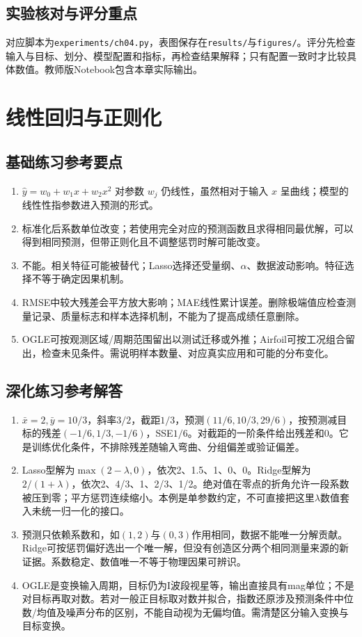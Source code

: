 \section*{实验核对与评分重点}
对应脚本为\texttt{experiments/ch04.py}，表图保存在\texttt{results/}与\texttt{figures/}。评分先检查输入与目标、划分、模型配置和指标，再检查结果解释；只有配置一致时才比较具体数值。教师版Notebook包含本章实际输出。

\chapter{线性回归与正则化}
\section*{基础练习参考要点}
\begin{enumerate}[label=\arabic*.]
\item $\hat y=w_0+w_1x+w_2x^2$ 对参数 $w_j$ 仍线性，虽然相对于输入 $x$ 呈曲线；模型的线性性指参数进入预测的形式。
\item 标准化后系数单位改变；若使用完全对应的预测函数且求得相同最优解，可以得到相同预测，但带正则化且不调整惩罚时解可能改变。
\item 不能。相关特征可能被替代；Lasso选择还受量纲、$\alpha$、数据波动影响。特征选择不等于确定因果机制。
\item RMSE中较大残差会平方放大影响；MAE线性累计误差。删除极端值应检查测量记录、质量标志和样本选择机制，不能为了提高成绩任意删除。
\item OGLE可按观测区域/周期范围留出以测试迁移或外推；Airfoil可按工况组合留出，检查未见条件。需说明样本数量、对应真实应用和可能的分布变化。
\end{enumerate}
\section*{深化练习参考解答}
\begin{enumerate}[label=D\arabic*.]
\item $\bar x=2,\bar y=10/3$，斜率$3/2$，截距$1/3$，预测$(11/6,10/3,29/6)$，按预测减目标的残差$( -1/6,1/3,-1/6)$，SSE$1/6$。对截距的一阶条件给出残差和0。它是训练优化条件，不排除残差随输入弯曲、分组偏差或验证偏差。
\item Lasso型解为$\max(2-\lambda,0)$，依次2、1.5、1、0、0。Ridge型解为$2/(1+\lambda)$，依次2、4/3、1、2/3、1/2。绝对值在零点的折角允许一段系数被压到零；平方惩罚连续缩小。本例是单参数约定，不可直接把这里$\lambda$数值套入未统一归一化的接口。
\item 预测只依赖系数和，如$(1,2)$与$(0,3)$作用相同，数据不能唯一分解贡献。Ridge可按惩罚偏好选出一个唯一解，但没有创造区分两个相同测量来源的新证据。系数稳定、数值唯一不等于物理因果可辨识。
\item OGLE是变换输入周期，目标仍为I波段视星等，输出直接具有mag单位；不是对目标再取对数。若对一般正目标取对数并拟合，指数还原涉及预测条件中位数/均值及噪声分布的区别，不能自动视为无偏均值。需清楚区分输入变换与目标变换。
\end{enumerate}

